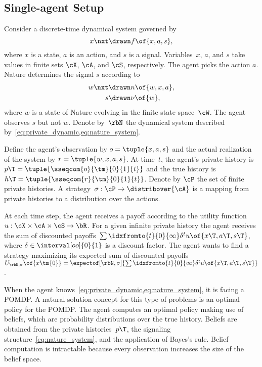\subsection{Single-agent Setup}

Consider a discrete-time dynamical system governed by
\begin{equation}
\label{eq:private_dynamic}
x\nxt \drawn  f \of{x, a, s},
\end{equation}
where \(x\) is a state, \(a\) is an action, and \(s\) is a signal.
Variables~\(x\), \(a\), and \(s\) take values in finite sets \(\cX\), \(\cA\), and \(\cS\), respectively.
The agent picks the action \(a\).
Nature determines the signal \(s\) according to
\begin{subequations}
\label{eq:nature_system}
\begin{align}
\label{eq:nature_dynamic}
w\nxt &\drawn n \of{w, x, a}, \\
\label{eq:nature_signal}
s &\drawn \nu \of{w},
\end{align}
\end{subequations}
where \(w\) is a state of Nature evolving in the finite state space~\(\cW\).
The agent observes \(s\) but not \(w\).
Denote by~\(\rbN\) the dynamical system described by~\cref{eq:private_dynamic,eq:nature_system}.

Define the agent's observation by \(o = \tuple{x, a, s}\) and the actual realization of the system by \(r = \tuple{w, x, a, s}\).
At time~\(t\), the agent's private history is \(p\T = \tuple{\sseqcom{o}{\tm}{0}{1}{t}}\) and the true history is \(h\T = \tuple{\sseqcom{r}{\tm}{0}{1}{t}}\).
Denote by \(\cP\) the set of finite private histories.
A strategy~\(\sigma : \cP \to \distribover{\cA}\) is a mapping from private histories to a distribution over the actions.

At each time step, the agent receives a payoff according to the utility function \(u: \cX \times \cA \times \cS \to \bR\).
For a given infinite private history the agent receives the sum of discounted payoffs~\(\sum\idxfromto{t}{0}{\infty} \delta^t u \of{x\T, a\T, s\T}\), where \(\delta \in \interval[oo]{0}{1}\) is a discount factor.
The agent wants to find a strategy maximizing its expected sum of discounted payoffs \(U\params{\rbN, \sigma}\of{x\tm{0}} = \expectof[\rbN, \sigma]{\sum\idxfromto{t}{0}{\infty} \delta^t u \of{x\T, a\T, s\T}}\).

When the agent knows~\cref{eq:private_dynamic,eq:nature_system}, it is facing a POMDP.
A natural solution concept for this type of problems is an optimal policy for the POMDP.
The agent computes an optimal policy making use of beliefs, which are probability distributions over the true history.
Beliefs are obtained from the private histories~\(p\T\), the signaling structure~\cref{eq:nature_system}, and the application of Bayes's rule.
Belief computation is intractable because every observation increases the size of the belief space.

